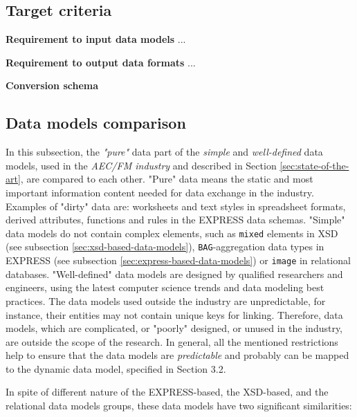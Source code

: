 \subsection{Target criteria}

\textbf{Requirement to input data models}
...


\textbf{Requirement to output data formats}
...

\textbf{Conversion schema}




\subsection{Data models comparison}






In this subsection, the \emph{"pure"} data part of the \emph{simple} and \emph{well-defined} data models, used in the \emph{AEC/FM industry} and described in Section \ref{sec:state-of-the-art}, are compared to each other.
"Pure" data means the static and most important information content needed for data exchange in the industry.
Examples of "dirty" data are: worksheets and text styles in spreadsheet formats, derived attributes, functions and rules in the EXPRESS data schemas.
"Simple" data models do not contain complex elements, such as \texttt{mixed} elements in XSD (see subsection \ref{sec:xsd-based-data-models}), \texttt{BAG}-aggregation data types in EXPRESS (see subsection \ref{sec:express-based-data-models}) or \texttt{image} in relational databases.
"Well-defined" data models are designed by qualified researchers and engineers, using the latest computer science trends and data modeling best practices.
The data models used outside the industry are unpredictable, for instance, their entities may not contain unique keys for linking.
Therefore, data models, which are complicated, or "poorly" designed, or unused in the industry, are outside the scope of the research.
In general, all the mentioned restrictions help to ensure that the data models are \emph{predictable} and probably can be mapped to the dynamic data model, specified in Section 3.2.





In spite of different nature of the EXPRESS-based, the XSD-based, and the relational data models groups, these data models have two significant similarities:


